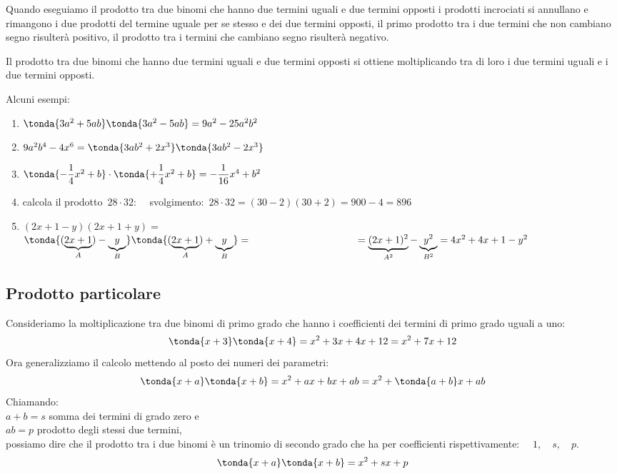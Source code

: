 Quando eseguiamo il prodotto tra due binomi che hanno due
termini uguali e due termini opposti i prodotti incrociati si annullano
e rimangono i due prodotti del termine uguale per se stesso e dei due
termini opposti, il primo prodotto tra i due termini che non cambiano 
segno risulterà positivo, il prodotto tra i termini che cambiano segno 
risulterà negativo. 

\osservazione Il prodotto tra due binomi che hanno due termini
uguali e due termini opposti si ottiene moltiplicando tra di loro i due 
termini uguali e i due termini opposti.

\begin{esempio}
Alcuni esempi:
\begin{enumerate}
\item \(\tonda{3a^{2}+5{ab}} \tonda{3a^{2}-5{ab}}=9a^{2}-25a^{2}b^{2}\)
\item \(9a^2b^4-4x^6 = \tonda{3ab^{2}+2x^3} \tonda{3ab^{2}-2x^3}\)
\item \(\tonda{-{\dfrac{1}{4}}x^{2}+b}\cdot \tonda{+{\dfrac{1}{4}}x^{2}+b}=
        -\dfrac{1}{16}x^{4}+b^{2}\)
\item calcola il prodotto~\(28 \cdot 32\):~~
svolgimento:~\(28\cdot 32=(30-2)(30+2)=900-4=896\)
\item \((2x+1-y)(2x+1+y)=\)
\(\tonda{(\underbrace{2x+1}_{A})-\underbrace{y}_{B}}
  \tonda{(\underbrace{2x+1}_{A})+\underbrace{y}_{B}}= \newline
\hspace*{36.5mm}
=\underbrace{(2x+1)^{2}}_{A^{2}}-\underbrace{y^{2}}_{B^{2}}=
4x^{2}+4x+1-y^{2}\)
\end{enumerate}
\end{esempio}



\subsection{Prodotto particolare}
\label{subsec:11_prodnot_particolare}

Consideriamo la moltiplicazione tra due binomi di primo grado che hanno i 
coefficienti dei termini di primo grado uguali a uno:
\[\tonda{x +3} \tonda{x+4} = x^2 +3x +4x +12 = x^2 +7x +12\]
Ora generalizziamo il calcolo mettendo al posto dei numeri dei parametri:
\[\tonda{x +a} \tonda{x+b} = x^2 +ax +bx +ab = x^2 +\tonda{a+b}x +ab\]
Chiamando:\\
\(a+b=s\) \quad somma dei termini di grado zero e\\
\(ab=p\) \quad prodotto degli stessi due termini,\\
possiamo dire che il prodotto tra i due binomi è un trinomio di secondo 
grado che ha per coefficienti rispettivamente: \(\quad 1, \quad s,\quad p\).
\[\tonda{x +a} \tonda{x+b} = x^2 +sx +p\]

